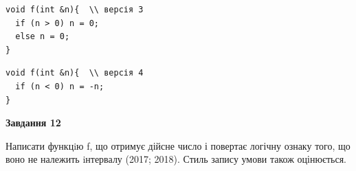 \documentclass[12pt, ukrainian]{article}
\begin{document}
{\begin {large}
\begin{minipage}[t]{11.0cm}
\vspace{-8mm}\begin{verbatim}
void f(int &n){  \\ версія 3
  if (n > 0) n = 0;
  else n = 0;
}
\end{verbatim}

\vspace{-8mm}\begin{verbatim}
void f(int &n){  \\ версія 4
  if (n < 0) n = -n;
}
\end{verbatim}



\begin{center}
\textbf{Завдання 12}
\end{center}

Написати функцiю f, що отримує дійсне число і повертає логічну ознаку того, що воно не належить iнтервалу (2017; 2018). Стиль запису умови також оцінюється.\par

\end{minipage}

\end {large}}
\newpage
\end{document}
